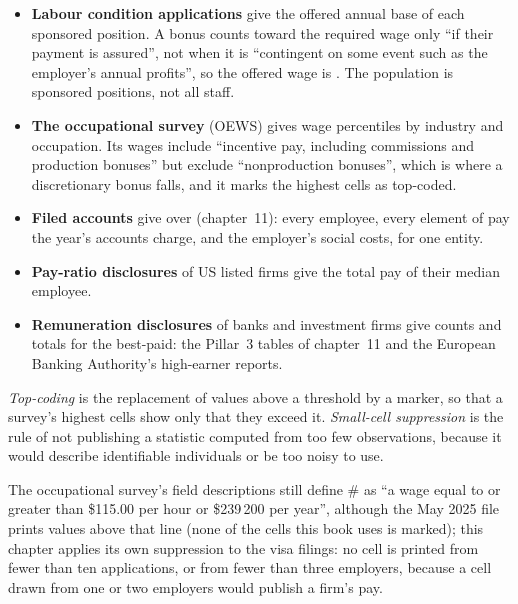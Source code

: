 \begin{itemize}
\item \textbf{Labour condition applications} give the offered annual base of each sponsored position. A bonus counts
toward the required wage only ``if their payment is assured'', not when it is ``contingent on some event such as the
employer's annual profits'', so the offered wage is . The population is sponsored positions, not all staff.
\item \textbf{The occupational survey} (OEWS) gives wage percentiles by industry and occupation. Its wages include
``incentive pay, including commissions and production bonuses'' but exclude ``nonproduction bonuses'', which is where a
discretionary bonus falls, and it marks the highest cells as top-coded.
\item \textbf{Filed accounts} give  over  (chapter~11): every employee, every element of
pay the year's accounts charge, and the employer's social costs, for one entity.
\item \textbf{Pay-ratio disclosures} of US listed firms give the total pay of their median employee.
\item \textbf{Remuneration disclosures} of banks and investment firms give counts and totals for the best-paid:
the Pillar~3 tables of chapter~11 and the European Banking Authority's high-earner reports.
\end{itemize}

\begin{definition}\label{def:in:pay-levels-by-role-firm-type-and-seniority:suppress}
\emph{Top-coding} is the replacement of values above a threshold by a marker, so that a survey's
highest cells show only that they exceed it. \emph{Small-cell suppression} is the rule of
not publishing a statistic computed from too few observations, because it would describe identifiable individuals or
be too noisy to use.
\end{definition}

The occupational survey's field descriptions still define \# as ``a wage equal to or greater than \$115.00 per hour or
\$239\,200 per year'', although the May 2025 file prints values above that line (none of the cells this book uses is
marked); this chapter applies its own suppression to the visa filings: no cell is printed from fewer than ten applications, or from
fewer than three employers, because a cell drawn from one or two employers would publish a firm's pay.

